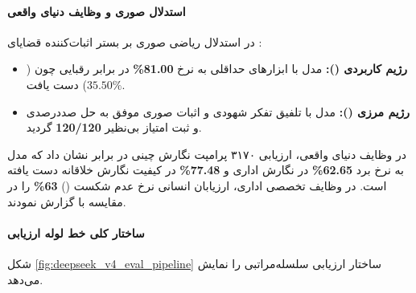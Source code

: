 \paragraph*{استدلال صوری و وظایف دنیای واقعی}
در استدلال ریاضی صوری بر بستر اثبات‌کننده قضایای :
\begin{itemize}
    \item \textbf{رژیم کاربردی ():} مدل  با ابزارهای حداقلی به نرخ \textbf{81.00\%} در برابر رقبایی چون  ($35.50\%$) دست یافت.
    \item \textbf{رژیم مرزی ():} مدل با تلفیق تفکر شهودی و اثبات صوری موفق به حل صددرصدی و ثبت امتیاز بی‌نظیر \textbf{120/120} گردید.
\end{itemize}
در وظایف دنیای واقعی، ارزیابی ۳۱۷۰ پرامپت نگارش چینی در برابر  نشان داد که مدل به نرخ برد \textbf{62.65\%} در نگارش اداری و \textbf{77.48\%} در کیفیت نگارش خلاقانه دست یافته است. در وظایف تخصصی اداری، ارزیابان انسانی نرخ عدم شکست () \textbf{63\%} را در مقایسه با  گزارش نمودند.

\paragraph*{ساختار کلی خط لوله ارزیابی}
شکل \ref{fig:deepseek_v4_eval_pipeline} ساختار ارزیابی سلسله‌مراتبی  را نمایش می‌دهد.

